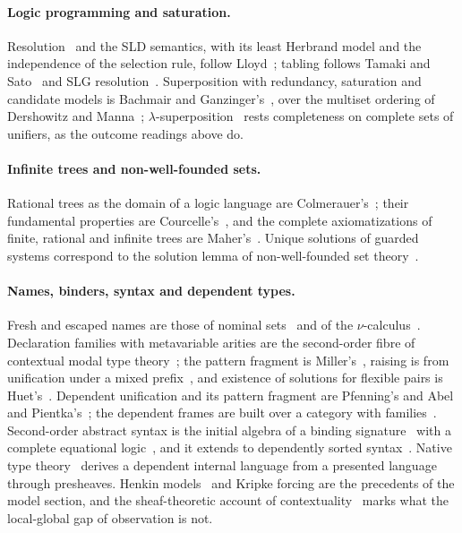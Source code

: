 \documentclass[11pt]{article}
\theoremstyle{remark}
\begin{document}
\paragraph{Logic programming and saturation.} Resolution~\cite{robinson65} and the SLD semantics, with its
least Herbrand model and the independence of the selection rule, follow Lloyd~\cite{lloyd87}; tabling
follows Tamaki and Sato~\cite{tamakisato86} and SLG resolution~\cite{chenwarren96}. Superposition with
redundancy, saturation and candidate models is Bachmair and Ganzinger's~\cite{bachmairganzinger94}, over the
multiset ordering of Dershowitz and Manna~\cite{dershowitzmanna79}; $\lambda$-superposition~\cite{bentkamp21}
rests completeness on complete sets of unifiers, as the outcome readings above do.

\paragraph{Infinite trees and non-well-founded sets.} Rational trees as the domain of a logic language
are Colmerauer's~\cite{colmerauer82}; their fundamental properties are Courcelle's~\cite{courcelle83}, and the
complete axiomatizations of finite, rational and infinite trees are Maher's~\cite{maher88}. Unique
solutions of guarded systems correspond to the solution lemma of non-well-founded set
theory~\cite{aczel88,barwisemoss96}.

\paragraph{Names, binders, syntax and dependent types.} Fresh and escaped names are those of nominal
sets~\cite{pitts13} and of the $\nu$-calculus~\cite{pittsstark93}. Declaration families with metavariable
arities are the second-order fibre of contextual modal type theory~\cite{cmtt08}; the pattern fragment is
Miller's~\cite{miller91}, raising is from unification under a mixed prefix~\cite{miller92}, and existence of
solutions for flexible pairs is Huet's~\cite{huet75}. Dependent unification and its pattern fragment are
Pfenning's and Abel and Pientka's~\cite{pfenning91,abelpientka11}; the dependent frames are built over a
category with families~\cite{dybjer96}. Second-order abstract syntax is the initial algebra of a
binding signature~\cite{fpt99} with a complete equational logic~\cite{fiorehur10}, and it extends to
dependently sorted syntax~\cite{fiore08}. Native type theory~\cite{williamsstay21} derives a dependent internal
language from a presented language through presheaves. Henkin models~\cite{henkin50} and Kripke forcing
are the precedents of the model section, and the sheaf-theoretic account of
contextuality~\cite{abramskybrandenburger11} marks what the local-global gap of observation is not.
\end{document}
